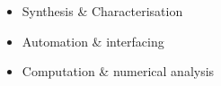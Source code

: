 \vspace{-0.4 cm}
\begin{multicols}{3}
\begin{itemize}[leftmargin=.4cm]
\item Synthesis \& Characterisation
\item Automation \& interfacing
\item Computation \& numerical analysis%
\end{itemize}
\end{multicols}